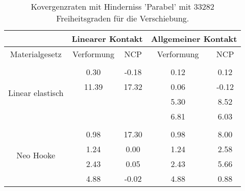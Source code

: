 \begin{table} 
\centering 
\begin{tabular}{c|cc|cc|} 
\cline{2-5} 
 & \multicolumn{2}{|c|}{Linearer Kontakt} & \multicolumn{2}{|c|}{Allgemeiner Kontakt} \\ 
\hline 
\multicolumn{1}{|c|}{Materialgesetz} & \multicolumn{1}{c|}{Verformung} & \multicolumn{1}{c|}{NCP} & \multicolumn{1}{c|}{Verformung} & \multicolumn{1}{c|}{NCP} \\ 
\hline 
\multicolumn{1}{|c|}{\multirow{5}{*}{Linear elastisch}} &\multicolumn{1}{|c|}{} & \multicolumn{1}{|c|}{} & \multicolumn{1}{|c|}{} & \multicolumn{1}{|c|}{} \\ 
\multicolumn{1}{|c|}{} & \multicolumn{1}{|c|}{      0.30} & \multicolumn{1}{|c|}{     -0.18} & \multicolumn{1}{|c|}{      0.12} & \multicolumn{1}{|c|}{      0.12} \\ 
\multicolumn{1}{|c|}{} & \multicolumn{1}{|c|}{     11.39} & \multicolumn{1}{|c|}{     17.32} & \multicolumn{1}{|c|}{      0.06} & \multicolumn{1}{|c|}{     -0.12} \\ 
\multicolumn{1}{|c|}{} & \multicolumn{1}{|c|}{} & \multicolumn{1}{|c|}{} & \multicolumn{1}{|c|}{      5.30} & \multicolumn{1}{|c|}{      8.52} \\ 
\multicolumn{1}{|c|}{} & \multicolumn{1}{|c|}{} & \multicolumn{1}{|c|}{} & \multicolumn{1}{|c|}{      6.81} & \multicolumn{1}{|c|}{      6.03} \\ 
\hline 
\multicolumn{1}{|c|}{\multirow{5}{*}{Neo Hooke}} &\multicolumn{1}{|c|}{} & \multicolumn{1}{|c|}{} & \multicolumn{1}{|c|}{} & \multicolumn{1}{|c|}{} \\ 
\multicolumn{1}{|c|}{} & \multicolumn{1}{|c|}{      0.98} & \multicolumn{1}{|c|}{     17.30} & \multicolumn{1}{|c|}{      0.98} & \multicolumn{1}{|c|}{      8.00} \\ 
\multicolumn{1}{|c|}{} & \multicolumn{1}{|c|}{      1.24} & \multicolumn{1}{|c|}{      0.00} & \multicolumn{1}{|c|}{      1.24} & \multicolumn{1}{|c|}{      2.58} \\ 
\multicolumn{1}{|c|}{} & \multicolumn{1}{|c|}{      2.43} & \multicolumn{1}{|c|}{      0.05} & \multicolumn{1}{|c|}{      2.43} & \multicolumn{1}{|c|}{      5.66} \\ 
\multicolumn{1}{|c|}{} & \multicolumn{1}{|c|}{      4.88} & \multicolumn{1}{|c|}{     -0.02} & \multicolumn{1}{|c|}{      4.88} & \multicolumn{1}{|c|}{      0.88} \\ 
\hline 
\end{tabular}\caption{Kovergenzraten mit Hinderniss 'Parabel' mit 33282 Freiheitsgraden für die Verschiebung.}\label{tab:Rate_Parabel_level6}
\end{table} 
